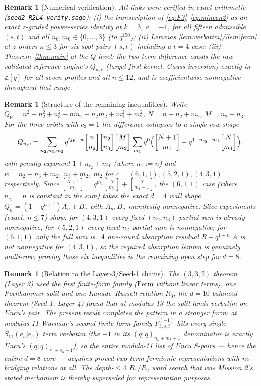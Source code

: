 \documentclass[11pt]{article}
\newtheorem{remark}[theorem]{Remark}
\newcommand{\qbin}[2]{\genfrac{[}{]}{0pt}{}{#1}{#2}}
\newcommand{\poch}[1]{(q;q)_{#1}}
\newcommand{\Ferm}{\mathrm{Ferm}}
\begin{document}
\begin{remark}[Numerical verification]
All links were verified in exact arithmetic
(\texttt{seed2\_R2L4\_verify.sage}):
(i) the transcription of \eqref{eq:F2}--\eqref{eq:mineen2} as an exact
$z$-graded power-series identity at $k=3$, $a=-1$, for all fifteen
admissible $(s,t)$ and all $n_0,m_0\in\{0,\dots,3\}$ (to $q^{150}$);
(ii) Lemmas \ref{lem:verbatim}/\ref{lem:ferm} at $z$-orders $n\le3$ for six
spot pairs $(s,t)$ including a $t=4$ case;
(iii) Theorem~\ref{thm:main} at the $Q$-level: the two-term difference
equals the raw-validated reference engine's $Q_{n,c}$ (target-first kernel,
Gauss inversion) \emph{exactly in} $\mathbb{Z}[q]$ for all seven profiles
and all $n\le 12$, and is coefficientwise nonnegative throughout that range.
\end{remark}

\begin{remark}[Structure of the remaining inequalities]
Write $Q_{\mathrm{F}}=n^2+n_2^2+n_3^2-nm_1-n_2m_2+m_1^2+m_2^2$,
$N=n-n_2+m_2$, $M=n_2+n_3$. For the three orbits with $c_3=1$ the
difference collapses to a \emph{single-row} shape
\[
Q_{n,c}=\sum_{n_2,n_3,m_2}q^{Q_{\mathrm{F}}+w}
\qbin{n}{n_2}\qbin{n_2}{n_3}\qbin{M}{m_2}
\sum_{m_1}q^{0}\Bigl(\qbin{N+1}{m_1}-q^{1+n_{c_2}+m_1}\qbin{N}{m_1}\Bigr),
\]
with penalty exponent $1+n_{c_2}+m_1$ (where $n_1:=n$) and
$w=n_2+n_3+m_2,\;n_3+m_2,\;m_2$ for $c=(6,1,1),(5,2,1),(4,3,1)$
respectively. Since $\qbin{N+1}{m_1}=q^{m_1}\qbin{N}{m_1}+\qbin{N}{m_1-1}$,
the $(6,1,1)$ case (where $n_{c_2}=n$ is constant in the sum) takes the
exact $d=4$ wall shape $Q_n=(1-q^{n+1})A_n+B_n$ with $A_n,B_n$ manifestly
nonnegative. Slice experiments (exact, $n\le7$) show: for $(4,3,1)$ every
fixed-$(n_2,n_3)$ partial sum is already nonnegative; for $(5,2,1)$ every
fixed-$n_2$ partial sum is nonnegative; for $(6,1,1)$ only the full sum is.
A one-round absorption residual $B-q^{1+n_3}A$ is \emph{not} nonnegative
for $(4,3,1)$, so the required absorption lemma is genuinely multi-row;
proving these six inequalities is the remaining open step for $d=8$.
\end{remark}

\begin{remark}[Relation to the Layer-3/Seed-1 chains]
The $(3,3,2)$ theorem (Layer 3) used the \emph{first} finite-form family
($\Ferm$ without linear terms), one Pochhammer split and one
Kanade--Russell relation $R_3$; the $d=10$ balanced theorem (Seed 1,
Layer 4) found that at modulus 13 the split lands verbatim on Uncu's pair.
The present result completes the pattern in a stronger form: at modulus 11
Warnaar's \emph{second} finite-form family $F^{(-1)}_{3,s,t}$ hits every
single $S_{11}(e_a|e_b)$ term verbatim (the $+1$ in its
$\poch{n_k+m_k+1}$ denominator is exactly Uncu's $\poch{r_3+s_3+1}$), so
the entire modulo-11 list of Uncu S-pairs --- hence the entire $d=8$ core
--- acquires proved two-term fermionic representations with no bridging
relations at all. The depth-$\le4$ $R_1/R_2$ word search that was Mission
2's stated mechanism is thereby superseded for representation purposes.
\end{remark}
\end{document}
